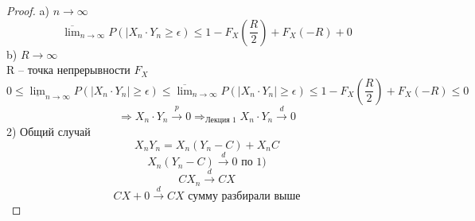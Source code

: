 \begin{proof}
		a) $ n\to\infty $\\
		$$ \overline{\lim}_{n\to\infty}P(|X_n\cdot Y_n\geqslant \epsilon ) \leqslant 1 - F_{X}(\frac{R}{2}) + F_{X}(-R) + 0$$
		b) $ R\to\infty $\\
			R -- точка непрерывности $ F_X $
			$$ 0 \leqslant \underline{\lim}_{n\to\infty}P(|X_n\cdot Y_n|\geqslant \epsilon ) \leqslant\overline{\lim}_{n\to\infty}P(|X_n\cdot Y_n|\geqslant \epsilon ) \leqslant 1 - F_{X}(\frac{R}{2}) + F_{X}(-R) \leqslant 0$$
	$$\Rightarrow X_n\cdot Y_n \xrightarrow{p}0 \Rightarrow_{\text{Лекция 1}} X_n\cdot Y_n \xrightarrow{d}0$$
	2) Общий случай\\
	$$X_nY_n = X_n(Y_n - C) + X_nC$$
	$$X_n(Y_n - C) \xrightarrow{d} 0 \text{ по 1)} $$
	$$CX_n \xrightarrow{d} CX$$
	$$ CX + 0 \xrightarrow{d} CX \text{ сумму разбирали выше} $$
	\end{proof}
